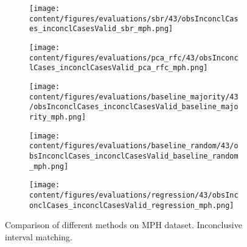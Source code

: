 \begin{figure}[t]
  \begin{subfigure}{0.5\textwidth}
    \centering
    \texttt{[image: content/figures/evaluations/sbr/43/obsInconclCases\_inconclCasesValid\_sbr\_mph.png]}
  \end{subfigure}
  \hfill
  \begin{subfigure}{0.5\textwidth}
    \centering
    \texttt{[image: content/figures/evaluations/pca\_rfc/43/obsInconclCases\_inconclCasesValid\_pca\_rfc\_mph.png]}
  \end{subfigure}
  \hfill
  \begin{subfigure}{0.5\textwidth}
    \centering
    \texttt{[image: content/figures/evaluations/baseline\_majority/43/obsInconclCases\_inconclCasesValid\_baseline\_majority\_mph.png]}
  \end{subfigure}
  \hfill
  \begin{subfigure}{0.5\textwidth}
    \centering
    \texttt{[image: content/figures/evaluations/baseline\_random/43/obsInconclCases\_inconclCasesValid\_baseline\_random\_mph.png]}
  \end{subfigure}
  \hfill
  \begin{subfigure}{0.5\textwidth}
    \centering
    \texttt{[image: content/figures/evaluations/regression/43/obsInconclCases\_inconclCasesValid\_regression\_mph.png]}
  \end{subfigure}

  \caption{Comparison of different methods on MPH dataset. Inconclusive interval matching.}
  \label{fig:test_interval_match_mph}
\end{figure}


